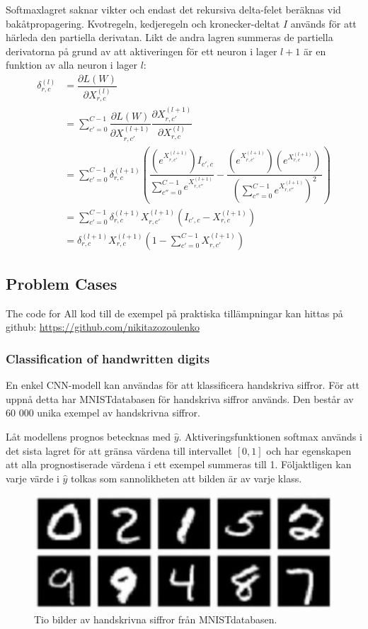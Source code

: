 \documentclass[a4paper,11pt,twoside]{article}
\newcommand*{\pd}[2]{\ensuremath{\dfrac{\partial #1}{\partial #2}}}
\begin{document}
Softmaxlagret saknar vikter och endast det rekursiva delta-felet beräknas vid bakåtpropagering. Kvotregeln, kedjeregeln och kronecker-deltat $I$ används för att härleda den partiella derivatan. Likt de andra lagren summeras de partiella derivatorna på grund av att aktiveringen för ett neuron i lager $l+1$ är en funktion av alla neuron i lager $l$: \cite{cs231n} \cite{notesonbackprop} \cite{websoftmax} 
\begin{equation}
\begin{split}
\delta^{(l)}_{r,c}
		& = \pd{L(W)}{X^{(l)}_{r,c}} \\
		& = \sum^{C-1}_{c'=0} \pd{L(W)}{X^{(l+1)}_{r,c'}} \pd{X^{(l+1)}_{r,c'}}{X^{(l)}_{r,c}} \\
		& = \sum^{C-1}_{c'=0} \delta^{(l+1)}_{r,c} \left(  \dfrac{(e^{X^{(l+1)}_{r,c'}})I_{c',c}}{\sum^{C-1}_{c''=0}e^{X^{(l+1)}_{r,c''}}} - \dfrac{(e^{X^{(l+1)}_{r,c'}})(e^{X^{(l+1)}_{r,c}})}{(\sum^{C-1}_{c''=0}e^{X^{(l+1)}_{r,c''}})^2} \right) \\
		& = \sum^{C-1}_{c'=0}  \delta^{(l+1)}_{r,c} X^{(l+1)}_{r,c'}(I_{c',c}-X^{(l+1)}_{r,c}) \\
		& = \delta^{(l+1)}_{r,c} X^{(l+1)}_{r,c} \left( 1-\sum^{C-1}_{c'=0} X^{(l+1)}_{r,c'} \right)
\end{split}
\end{equation}

\subsection{Problem Cases}
The code for 
All kod till de exempel på praktiska tillämpningar kan hittas på github: \url{https://github.com/nikitazozoulenko}
\subsubsection{Classification of handwritten digits}
En enkel CNN-modell kan användas för att klassificera handskriva siffror. För att uppnå detta har MNISTdatabasen för handskriva siffror används. Den består av 60 000 unika exempel av handskrivna siffror. \cite{MNIST}

Låt modellens prognos betecknas med $\hat{y}$. Aktiveringsfunktionen softmax används i det sista lagret för att gränsa värdena till intervallet $[0,1]$ och har egenskapen att alla prognostiserade värdena i ett exempel summeras till 1. Följaktligen kan varje värde i $\hat{y}$ tolkas som sannolikheten att bilden är av varje klass. \cite{cs231n}

\begin{figure}[h]\label{figMNIST}
	\centering
  		\includegraphics[scale=1]{mnist.png}
  	\caption{Tio bilder av handskrivna siffror från MNISTdatabasen. \cite{MNIST}}
\end{figure}
\end{document}
